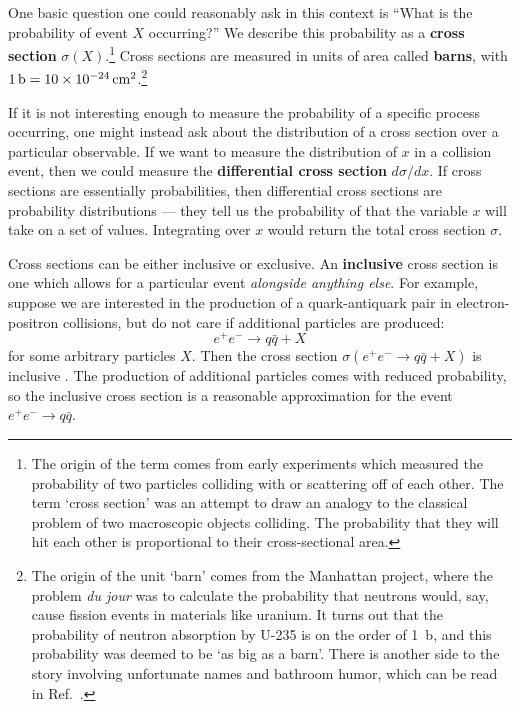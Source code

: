 \documentclass[../thesis.tex]{subfiles}
\begin{document}
	One basic question one could reasonably ask in this context is ``What is the probability of event $X$ occurring?'' We describe this probability as a \textbf{cross section} $\sigma(X)$.\footnote{The origin of the term comes from early experiments which measured the probability of two particles colliding with or scattering off of each other. The term `cross section' was an attempt to draw an analogy to the classical problem of two macroscopic objects colliding. The probability that they will hit each other is proportional to their cross-sectional area.} Cross sections are measured in units of area called \textbf{barns}, with $\SI{1}{\barn} = \SI{10E-24}{\square\centi\meter}$.\footnote{The origin of the unit `barn' comes from the Manhattan project, where the problem \textit{du jour} was to calculate the probability that neutrons would, say, cause fission events in materials like uranium. It turns out that the probability of neutron absorption by U-235 is on the order of \SI{1}{\barn}, and this probability was deemed to be `as big as a barn'. There is another side to the story involving unfortunate names and bathroom humor, which can be read in Ref.~\cite{holloway_how_1972}.}

	If it is not interesting enough to measure the probability of a specific process occurring, one might instead ask about the distribution of a cross section over a particular observable. If we want to measure the distribution of $x$ in a collision event, then we could measure the \textbf{differential cross section} $d\sigma/dx$. If cross sections are essentially probabilities, then differential cross sections are probability distributions --- they tell us the probability of that the variable $x$ will take on a set of values. Integrating over $x$ would return the total cross section $\sigma$.

	Cross sections can be either inclusive or exclusive. An \textbf{inclusive} cross section is one which allows for a particular event \textit{alongside anything else}. For example, suppose we are interested in the production of a quark-antiquark pair in electron-positron collisions, but do not care if additional particles are produced:
	\begin{equation}
		e^+ e^- \to q \bar q + X
	\end{equation}
	for some arbitrary particles $X$. Then the cross section $\sigma(e^+ e^- \to q \bar q + X)$ is inclusive \cite{larkoski_elementary_2019-1}. The production of additional particles comes with reduced probability, so the inclusive cross section is a reasonable approximation for the event $e^+ e^- \to q \bar q$. 
\end{document}
